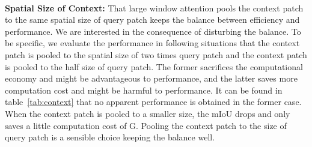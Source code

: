 \documentclass[10pt,twocolumn,letterpaper]{article}
\begin{document}
\medskip\\
\noindent
\textbf{Spatial Size of Context:} That large window attention pools the context patch to the same spatial size of query patch keeps the balance between efficiency and performance. We are interested in the consequence of disturbing the balance. To be specific, we evaluate the performance in following situations that the context patch is pooled to the spatial size of two times query patch and the context patch is pooled to the half size of query patch. The former sacrifices the computational economy and might be advantageous to performance, and the latter saves more computation cost and might be harmful to performance. It can be found in table~\ref{tab:context} that no apparent performance is obtained in the former case. When the context patch is pooled to a smaller size, the mIoU drops  and only saves a little computation cost of G. Pooling the context patch to the size of query patch is a sensible choice keeping the balance well.
\end{document}
